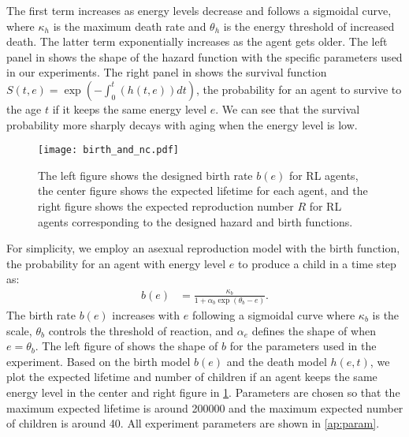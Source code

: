 The first term increases as energy levels decrease and follows a sigmoidal curve, where $\kappa_{h}$ is the maximum death rate and $\theta_h$ is the energy threshold of increased death. %
The latter term %
exponentially increases as the agent gets older.
The left panel in  shows the shape of the hazard function with the specific parameters used in our experiments. 
The right panel in  shows the
survival function $S(t, e) = \exp (-\int_{0}^{t}(h(t, e)) dt)$, the probability for an agent to survive to the age $t$ if it keeps the same energy level $e$. 
We can see that the survival probability more sharply decays with aging when the energy level is low.

\begin{figure}[t]
  \centering{}
  \texttt{[image: birth\_and\_nc.pdf]}
  \caption{
    The left figure shows the designed birth rate $b(e)$ for RL agents, the center figure shows the expected lifetime for each agent, and the right figure shows the expected reproduction number $R$ for RL agents corresponding to the designed hazard and birth functions.
  }\label{figure:bnc}
\end{figure}

For simplicity, we employ an asexual reproduction model 
with the birth function, the probability for an agent with energy level $e$ to produce a child in a time step as:
\begin{align}
 b(e) &= \frac{\kappa_{b}}{1 + \alpha_{b}\exp(\theta_{b} - e)}. 
 \label{eq:b}
\end{align}
The birth rate $b(e)$ increases with $e$ following a sigmoidal curve where $\kappa_{b}$ is the scale, $\theta_{b}$ controls the threshold of reaction, and $\alpha_{e}$ defines the shape of when $e = \theta_{b}$. 
The left figure of  shows the shape of $b$ for the parameters used in the experiment. 
Based on the birth model $b(e)$ and the death model $h(e,t)$, we plot the expected lifetime and number of children if an agent keeps the same energy level in the center and right figure in \cref{figure:bnc}. Parameters are chosen so that the maximum expected lifetime is around \num{200000} and the maximum expected number of children is around 40. All experiment parameters are shown in \cref{ap:param}.

